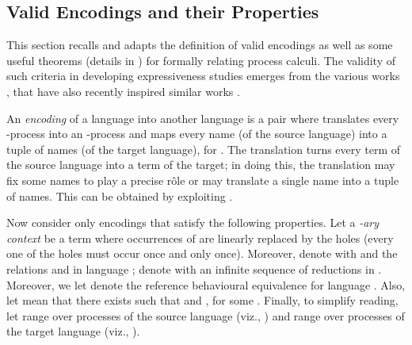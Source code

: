 \documentclass{LMCS}
\begin{document}
\subsection{Valid Encodings and their Properties}

This section recalls and adapts the definition of valid encodings as well as some
useful theorems (details in \cite{G:CONCUR08}) for formally relating process calculi.
The validity of such criteria in developing expressiveness studies emerges from the
various works 
\cite{G:IC08,G:DC10,G:CONCUR08}, that have also recently inspired similar works 
\cite{LPSS10,LVF10,gla12}. 

An {\em encoding} of a language  into another language  is a pair 
where  translates every -process into an -process
and  maps every name (of the source language) into a tuple of  names (of the target language), for .
The translation  turns every term of the source language into a term of the target; in doing this,
the translation may fix some names to play a precise r\^ole 
or may translate a single name into a tuple of names. This can be obtained
by exploiting . 

Now consider only encodings that satisfy the following properties.
Let a {\em -ary
context}  be a term where 
occurrences of  are linearly replaced by the holes  (every one of the  holes must occur once and only once).
Moreover, denote with  and  
the relations  and  in language ;
denote with  an infinite sequence of reductions in .
Moreover, we let  denote the reference behavioural equivalence for language .
Also, let  mean that there exists  such that  and ,
for some .
Finally, to simplify reading, let  range
over processes of the source language (viz., ) and  range
over processes of the target language (viz., ).
\end{document}
